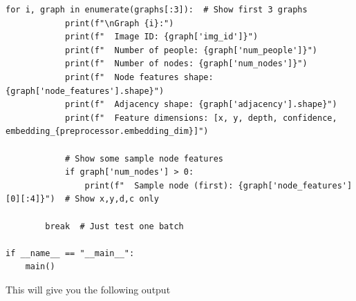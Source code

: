 \begin{lstlisting}[style=pythonstyle,title={Preprocessing May Main},label={code:preprocessing_may_main}]
        for i, graph in enumerate(graphs[:3]):  # Show first 3 graphs
            print(f"\nGraph {i}:")
            print(f"  Image ID: {graph['img_id']}")
            print(f"  Number of people: {graph['num_people']}")
            print(f"  Number of nodes: {graph['num_nodes']}")
            print(f"  Node features shape: {graph['node_features'].shape}")
            print(f"  Adjacency shape: {graph['adjacency'].shape}")
            print(f"  Feature dimensions: [x, y, depth, confidence, embedding_{preprocessor.embedding_dim}]")
            
            # Show some sample node features
            if graph['num_nodes'] > 0:
                print(f"  Sample node (first): {graph['node_features'][0][:4]}")  # Show x,y,d,c only
        
        break  # Just test one batch

if __name__ == "__main__":
    main()
\end{lstlisting}

This will give you the following output

